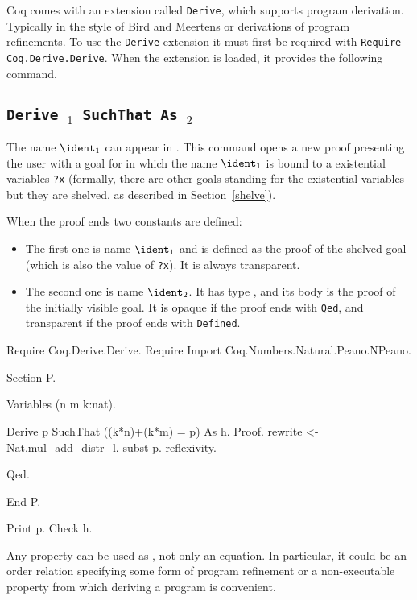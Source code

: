 

Coq comes with an extension called {\tt Derive}, which supports
program derivation. Typically in the style of Bird and Meertens or
derivations of program refinements. To use the {\tt Derive} extension
it must first be required with {\tt Require Coq.Derive.Derive}. When
the extension is loaded, it provides the following command.

\subsection[\tt Derive \ident$_1$ SuchThat \term{} As \ident$_2$]
       {\tt Derive \ident$_1$ SuchThat \term{} As \ident$_2$}

The name $\ident_1$ can appear in \term. This command opens a new
proof presenting the user with a goal for \term{} in which the name
$\ident_1$ is bound to a existential variables {\tt ?x} (formally,
there are other goals standing for the existential variables but they
are shelved, as described in Section~\ref{shelve}).

When the proof ends two constants are defined:
\begin{itemize}
\item The first one is name $\ident_1$ and is defined as the proof of
  the shelved goal (which is also the value of {\tt ?x}). It is
always transparent.
\item The second one is name $\ident_2$. It has type {\tt \term}, and
  its body is the proof of the initially visible goal. It is opaque if
  the proof ends with {\tt Qed}, and transparent if the proof ends
  with {\tt Defined}.
\end{itemize}

\Example
\begin{coq_example*}
Require Coq.Derive.Derive.
Require Import Coq.Numbers.Natural.Peano.NPeano.

Section P.

Variables (n m k:nat).

\end{coq_example*}
\begin{coq_example}
Derive p SuchThat ((k*n)+(k*m) = p) As h.
Proof.
rewrite <- Nat.mul_add_distr_l.
subst p.
reflexivity.
\end{coq_example}
\begin{coq_example*}
Qed.

End P.

\end{coq_example*}
\begin{coq_example}
Print p.
Check h.
\end{coq_example}

Any property can be used as \term, not only an equation. In
particular, it could be an order relation specifying some form of
program refinement or a non-executable property from which deriving a
program is convenient.
